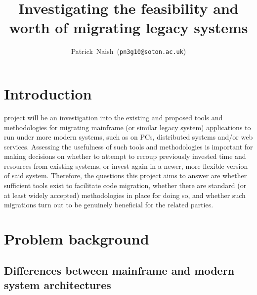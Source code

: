 \documentclass[12pt,journal,compsoc]{IEEEtran}
\begin{document}
\title{Investigating the feasibility and worth of migrating legacy systems}
\author{Patrick~Naish~(\texttt{pn3g10@soton.ac.uk})}




\maketitle

\IEEEdisplaynotcompsoctitleabstractindextext

\IEEEpeerreviewmaketitle

\section{Introduction}
\label{sec:introduction}

 project will be an investigation into the existing and proposed tools and methodologies for migrating mainframe (or similar legacy system) applications to run under more modern systems, such as on PCs, distributed systems and/or web services. Assessing the usefulness of such tools and methodologies is important for making decisions on whether to attempt to recoup previously invested time and resources from existing systems, or invest again in a newer, more flexible version of said system. Therefore, the questions this project aims to answer are whether sufficient tools exist to facilitate code migration, whether there are standard\cite{Almonaies2010} (or at least widely accepted) methodologies in place for doing so, and whether such migrations turn out to be genuinely beneficial for the related parties.

\section{Problem background}
\label{sec:background}

\subsection{Differences between mainframe and modern system architectures}
\label{subsec:differences}
\end{document}
